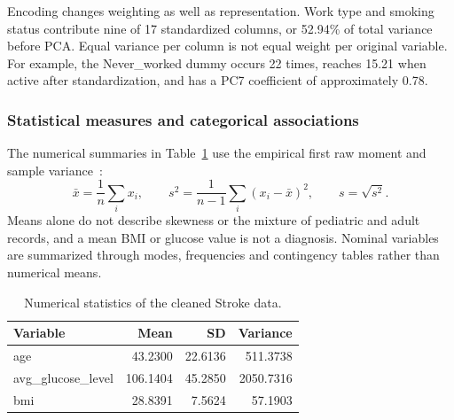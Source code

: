 \documentclass[12pt, a4paper]{article}
\begin{document}
Encoding changes weighting as well as representation. Work type and smoking status contribute nine of 17 standardized columns, or 52.94\% of total variance before PCA. Equal variance per column is not equal weight per original variable. For example, the Never\_worked dummy occurs 22 times, reaches 15.21 when active after standardization, and has a PC7 coefficient of approximately 0.78.

\subsubsection{Statistical measures and categorical associations}
The numerical summaries in Table~\ref{tab:stroke-stats} use the empirical first raw moment and sample variance~\cite{dm25,dm3}:
\[
\bar x=\frac1n\sum_i x_i,\qquad
s^2=\frac1{n-1}\sum_i(x_i-\bar x)^2,\qquad s=\sqrt{s^2}.
\]
Means alone do not describe skewness or the mixture of pediatric and adult records, and a mean BMI or glucose value is not a diagnosis. Nominal variables are summarized through modes, frequencies and contingency tables rather than numerical means.
\begin{table}[htbp]
\centering\small
\setlength{\tabcolsep}{4pt}\renewcommand{\arraystretch}{1.12}
\caption{Numerical statistics of the cleaned Stroke data.}
\label{tab:stroke-stats}
\begin{tabular}{lrrr}
\toprule
\textbf{Variable} & \textbf{Mean} & \textbf{SD} & \textbf{Variance} \tabularnewline
\midrule
age & 43.2300 & 22.6136 & 511.3738 \tabularnewline
avg\_glucose\_level & 106.1404 & 45.2850 & 2050.7316 \tabularnewline
bmi & 28.8391 & 7.5624 & 57.1903 \tabularnewline
\bottomrule
\end{tabular}
\end{table}
\end{document}
